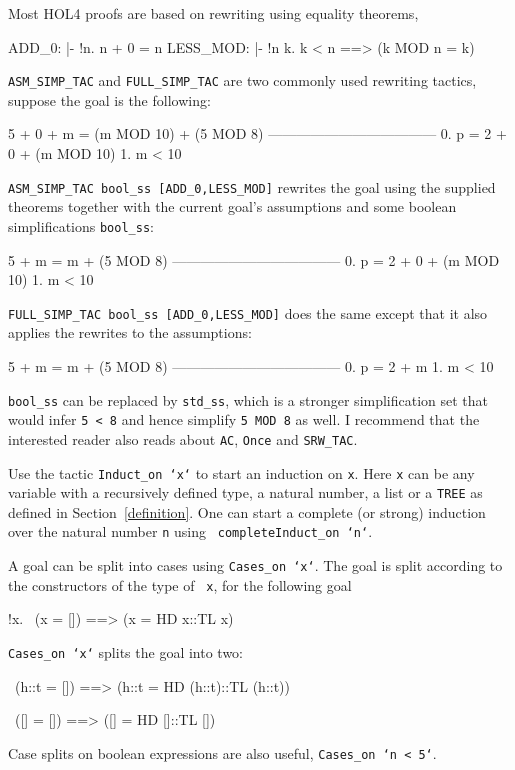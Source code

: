 \documentclass[a4paper,10pt]{article}
\begin{document}

Most HOL4 proofs are based on rewriting using equality theorems, \eg{}
\begin{code}
ADD_0:            |- !n. n + 0 = n
LESS_MOD:         |- !n k. k < n ==> (k MOD n = k)
\end{code} {\tt \small ASM\_SIMP\_TAC} and {\tt \small FULL\_SIMP\_TAC} are two
commonly used rewriting tactics, \eg{} suppose the goal is the following:
\begin{code}
    5 + 0 + m = (m MOD 10) + (5 MOD 8)
    ------------------------------------
      0.  p = 2 + 0 + (m MOD 10)
      1.  m < 10
\end{code}
{\tt \small ASM\_SIMP\_TAC bool\_ss
  [ADD\_0,LESS\_MOD]} rewrites the
goal using the supplied theorems together with the current goal's
assumptions and some boolean simplifications {\tt \small bool\_ss}:
\begin{code}
    5 + m = m + (5 MOD 8)
    ------------------------------------
      0.  p = 2 + 0 + (m MOD 10)
      1.  m < 10
\end{code}
{\tt \small FULL\_SIMP\_TAC bool\_ss [ADD\_0,LESS\_MOD]}
does the same except that it also applies the rewrites to the
assumptions:
\begin{code}
    5 + m = m + (5 MOD 8)
    ------------------------------------
      0.  p = 2 + m
      1.  m < 10
\end{code}

{\tt \small bool\_ss} can be replaced by {\tt \small std\_ss}, which
is a stronger simplification set that would infer {\tt \small 5 < 8}
and hence simplify {\tt\small 5 MOD 8} as well. I recommend that the
interested reader also reads about {\tt\small AC}, {\tt\small Once}
and {\tt\small SRW\_TAC}.


Use the tactic {\tt\small Induct\_on `x`} to start an induction on {\tt\small x}.
Here {\tt x} can be any variable with a recursively defined type,
\eg{} a natural number, a list or a {\tt\small TREE} as defined in
Section~\ref{definition}.  One can start a complete (or strong)
induction over the natural number {\tt\small n} using {\tt\small
  completeInduct\_on `n`}.


A goal can be split into cases using {\tt\small Cases\_on `x`}. The
goal is split according to the constructors of the type of {\tt\small
  x}, \eg{} for the following goal
\begin{code}
    !x. ~(x = []) ==> (x = HD x::TL x)
\end{code}
{\tt\small Cases\_on `x`} splits the goal into two:
\begin{code}
    ~(h::t = []) ==> (h::t = HD (h::t)::TL (h::t))

    ~([] = []) ==> ([] = HD []::TL [])
\end{code}
Case splits on boolean expressions are also useful, \eg{} {\tt\small Cases\_on `n < 5`}.
\end{document}
